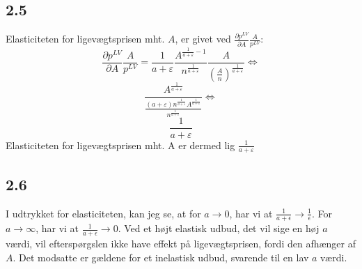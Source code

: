 \documentclass{article}
\begin{document}
\subsection*{2.5}
Elasticiteten for ligevægtsprisen mht. $A$, er givet ved $\frac{\partial p^{LV}}{\partial A} \frac{A}{p^{LV}}$:
\begin{equation}
    \frac{\partial p^{LV}}{\partial A} \frac{A}{p^{LV}}=\frac{1}{a+\varepsilon} \frac{A^{\frac{1}{a+\varepsilon}-1}}{n^{\frac{1}{a+\varepsilon}}} \frac{A}{\left(\frac{A}{n}\right)^{\frac{1}{a+\varepsilon}}} \Leftrightarrow
\end{equation}
\begin{equation}
    \frac{A^{\frac{1}{a+\varepsilon}}}{\frac{(a+\varepsilon) n^{\frac{1}{a+\varepsilon}} A^{\frac{1}{a+\varepsilon}}}{n^{\frac{1}{a+\varepsilon}}}} \Leftrightarrow
\end{equation}
\begin{equation}
    \frac{1}{a+\varepsilon}
\end{equation}
Elasticiteten for ligevægtsprisen mht. A er dermed lig $ \frac{1}{a+\varepsilon}$

\subsection*{2.6}
I udtrykket for elasticiteten, kan jeg se, at for $a \rightarrow 0$, har vi at $\frac{1}{a+\epsilon} \rightarrow \frac{1}{\epsilon}$. For $a \rightarrow \infty$, har vi at $\frac{1}{a+\epsilon} \rightarrow 0$. Ved et højt elastisk udbud, det vil sige en høj $a$ værdi, vil efterspørgslen ikke have effekt på ligevægtsprisen, fordi den afhænger af $A$. Det modsatte er gældene for et inelastisk udbud, svarende til en lav $a$ værdi.
\end{document}
